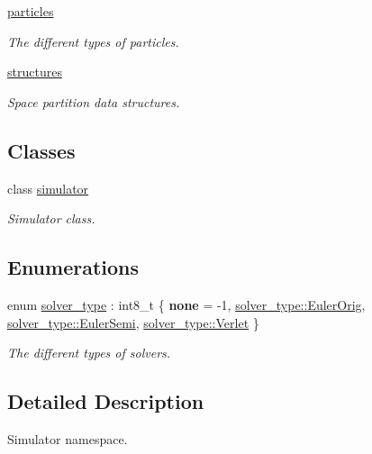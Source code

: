 \begin{DoxyCompactItemize}
 \hyperlink{namespacephysim_1_1particles}{particles}
\begin{DoxyCompactList}\small\item\em The different types of particles. \end{DoxyCompactList}\item 
 \hyperlink{namespacephysim_1_1structures}{structures}
\begin{DoxyCompactList}\small\item\em Space partition data structures. \end{DoxyCompactList}\end{DoxyCompactItemize}
\subsection*{Classes}
\begin{DoxyCompactItemize}
\item 
class \hyperlink{classphysim_1_1simulator}{simulator}
\begin{DoxyCompactList}\small\item\em Simulator class. \end{DoxyCompactList}\end{DoxyCompactItemize}
\subsection*{Enumerations}
\begin{DoxyCompactItemize}
\item 
enum \hyperlink{namespacephysim_a09adeda29c09e651877e880d31fc9686}{solver\+\_\+type} \+: int8\+\_\+t \{ {\bfseries none} = -\/1, 
\hyperlink{namespacephysim_a09adeda29c09e651877e880d31fc9686aa1a59d5d012fd05efb1223f874f77d4b}{solver\+\_\+type\+::\+Euler\+Orig}, 
\hyperlink{namespacephysim_a09adeda29c09e651877e880d31fc9686a1855dee0fffde2f4ed8ef6c4a0420b30}{solver\+\_\+type\+::\+Euler\+Semi}, 
\hyperlink{namespacephysim_a09adeda29c09e651877e880d31fc9686ac1f9df543f33d8a79fb2437c853f09b9}{solver\+\_\+type\+::\+Verlet}
 \}\begin{DoxyCompactList}\small\item\em The different types of solvers. \end{DoxyCompactList}
\end{DoxyCompactItemize}


\subsection{Detailed Description}
Simulator namespace. 


